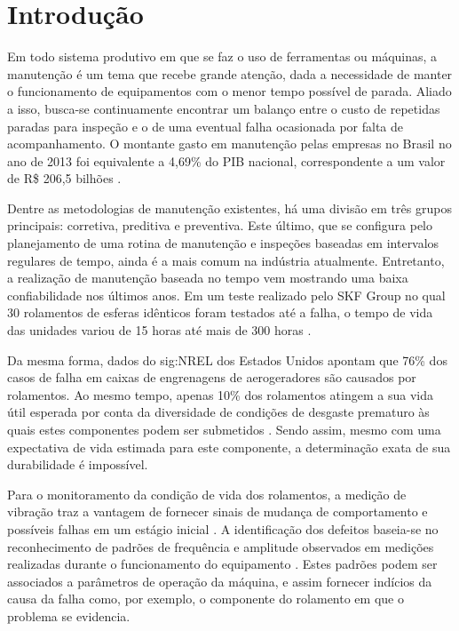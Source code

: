 \documentclass[12pt,oneside,english,brazil,lmodern,siglas,simbolos,cite=num]{ucsmonograph}
\begin{document}
	\listoftodos
	
	\textual %
	
	\chapter{Introdução}
	Em todo sistema produtivo em que se faz o uso de ferramentas ou máquinas, a manutenção é um tema que recebe grande atenção, dada a necessidade de manter o funcionamento de equipamentos com o menor tempo possível de parada.
	Aliado a isso, busca-se continuamente encontrar um balanço entre o custo de repetidas paradas para inspeção e o de uma eventual falha ocasionada por falta de acompanhamento.
	O montante gasto em manutenção pelas empresas no Brasil no ano de 2013 foi equivalente a 4,69\% do PIB nacional, correspondente a um valor de R\$ 206,5 bilhões \cite{seleme:2015}.
	
	Dentre as metodologias de manutenção existentes, há uma divisão em três grupos principais: corretiva, preditiva e preventiva.
	Este último, que se configura pelo planejamento de uma rotina de manutenção e inspeções baseadas em intervalos regulares de tempo, ainda é a mais comum na indústria atualmente.
	Entretanto, a realização de manutenção baseada no tempo vem mostrando uma baixa confiabilidade nos últimos anos.
	Em um teste realizado pelo SKF Group no qual 30 rolamentos de esferas idênticos foram testados até a falha, o tempo de vida das unidades variou de 15 horas até mais de 300 horas \cite{hashemian:2011}.
	 
	Da mesma forma, dados do \gls{sig:NREL} dos Estados Unidos apontam que 76\% dos casos de falha em caixas de engrenagens de aerogeradores são causados por rolamentos.
	Ao mesmo tempo, apenas 10\% dos rolamentos atingem a sua vida útil esperada por conta da diversidade de condições de desgaste prematuro às quais estes componentes podem ser submetidos \cite{peeters:2018}.
	Sendo assim, mesmo com uma expectativa de vida estimada para este componente, a determinação exata de sua durabilidade é impossível.
	
	Para o monitoramento da condição de vida dos rolamentos, a medição de vibração traz a vantagem de fornecer sinais de mudança de comportamento e possíveis falhas em um estágio inicial \cite{al-najjar:2004}.
	A identificação dos defeitos baseia-se no reconhecimento de padrões de frequência e amplitude observados em medições realizadas durante o funcionamento do equipamento \cite{carden:2004}.
	Estes padrões podem ser associados a parâmetros de operação da máquina, e assim fornecer indícios da causa da falha como, por exemplo, o componente do rolamento em que o problema se evidencia.
	
\end{document}
